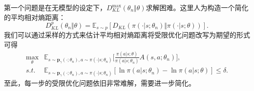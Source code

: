 第一个问题是在无模型的设定下，$D^{\max}_{KL}(\theta_n \Vert \theta)$求解困难。这里人为构造一个简化的平均相对熵距离：
\begin{equation}
    D^{p}_{KL}(\theta_n \Vert \theta) = \mathbb{E}_{s \sim p}[D_{KL}(\pi(\cdot \vert s; \theta_n) \Vert \pi(\cdot \vert s; \theta))].
\end{equation}
我们可以通过采样的方式来估计平均相对熵距离将受限优化问题改写为期望的形式可得
\begin{equation}
    \begin{aligned}
    \max_{\theta} &\mathbb{E}_{s \sim \mathbf{p}_{\gamma}(\cdot; \theta_n), a \sim \pi(\cdot \vert s; \theta_n)} \bigg[ \frac{\pi(a \vert s; \theta)}{\pi(a \vert s; \theta_n)} A(s, a; \theta_n)\bigg], \\
    s.t. & \mathbb{E}_{s \sim \mathbf{p}_{\gamma}(\cdot; \theta_n), a \sim \pi(\cdot \vert s; \theta_n)} [\ln \pi(a \vert s; \theta_n) - \ln \pi(a \vert s; \theta)] \le \delta.
    \end{aligned}
\end{equation}
至此，每一步的受限优化问题依旧非常难解，需要进一步简化。

